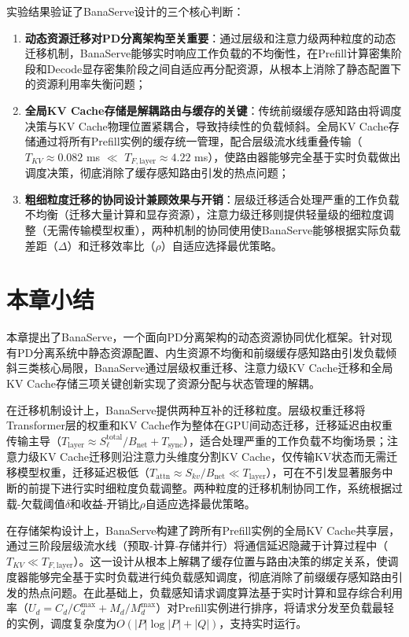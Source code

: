 实验结果验证了BanaServe设计的三个核心判断：

\begin{enumerate}
    \item \textbf{动态资源迁移对PD分离架构至关重要}：通过层级和注意力级两种粒度的动态迁移机制，BanaServe能够实时响应工作负载的不均衡性，在Prefill计算密集阶段和Decode显存密集阶段之间自适应再分配资源，从根本上消除了静态配置下的资源利用率失衡问题；

    \item \textbf{全局KV Cache存储是解耦路由与缓存的关键}：传统前缀缓存感知路由将调度决策与KV Cache物理位置紧耦合，导致持续性的负载倾斜。全局KV Cache存储通过将所有Prefill实例的缓存统一管理，配合层级流水线重叠传输（$T_{KV} \approx 0.082$ ms $\ll$ $T_{F,\text{layer}} \approx 4.22$ ms），使路由器能够完全基于实时负载做出调度决策，彻底消除了缓存感知路由引发的热点问题；

    \item \textbf{粗细粒度迁移的协同设计兼顾效果与开销}：层级迁移适合处理严重的工作负载不均衡（迁移大量计算和显存资源），注意力级迁移则提供轻量级的细粒度调整（无需传输模型权重），两种机制的协同使用使BanaServe能够根据实际负载差距（$\Delta$）和迁移效率比（$\rho$）自适应选择最优策略。
\end{enumerate}

\section{本章小结}
\label{sec:bana_summary}

本章提出了BanaServe，一个面向PD分离架构的动态资源协同优化框架。针对现有PD分离系统中静态资源配置、内生资源不均衡和前缀缓存感知路由引发负载倾斜三类核心局限，BanaServe通过层级权重迁移、注意力级KV Cache迁移和全局KV Cache存储三项关键创新实现了资源分配与状态管理的解耦。

在迁移机制设计上，BanaServe提供两种互补的迁移粒度。层级权重迁移将Transformer层的权重和KV Cache作为整体在GPU间动态迁移，迁移延迟由权重传输主导（$T_{\text{layer}} \approx S^{\text{total}}_\ell / B_{\text{net}} + T_{\text{sync}}$），适合处理严重的工作负载不均衡场景；注意力级KV Cache迁移则沿注意力头维度分割KV Cache，仅传输KV状态而无需迁移模型权重，迁移延迟极低（$T_{\text{attn}} \approx S_{kv}/B_{\text{net}} \ll T_{\text{layer}}$），可在不引发显著服务中断的前提下进行实时细粒度负载调整。两种粒度的迁移机制协同工作，系统根据过载-欠载阈值$\delta$和收益-开销比$\rho$自适应选择最优策略。

在存储架构设计上，BanaServe构建了跨所有Prefill实例的全局KV Cache共享层，通过三阶段层级流水线（预取-计算-存储并行）将通信延迟隐藏于计算过程中（$T_{KV} \ll T_{F,\text{layer}}$）。这一设计从根本上解耦了缓存位置与路由决策的绑定关系，使调度器能够完全基于实时负载进行纯负载感知调度，彻底消除了前缀缓存感知路由引发的热点问题。在此基础上，负载感知请求调度算法基于实时计算和显存综合利用率（$U_d = C_d/C^{\max}_d + M_d/M^{\max}_d$）对Prefill实例进行排序，将请求分发至负载最轻的实例，调度复杂度为$O(|P| \log |P| + |Q|)$，支持实时运行。

